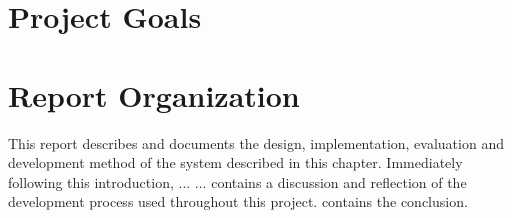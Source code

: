 
\section{Project Goals}

\section{Report Organization}
This report describes and documents the design, implementation, evaluation and development method of the system described in this chapter. Immediately following this introduction,  ... \dummy ...  contains a discussion and reflection of the development process used throughout this project.  contains the conclusion.